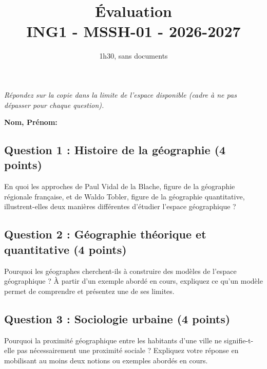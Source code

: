 \documentclass[
]{article}
\title{{\'E}valuation\\
ING1 - MSSH-01 - 2026-2027}
\author{}
\date{\vspace{-2.5em}1h30, sans documents}
\begin{document}
\maketitle

\textit{Répondez sur la copie dans la limite de l'espace disponible (cadre à ne pas dépasser pour chaque question).}

\medskip

\textbf{Nom, Prénom:}

\vspace{3cm}

\subsection{Question 1 : Histoire de la géographie (4 points)} %

En quoi les approches de Paul Vidal de la Blache, figure de la géographie régionale française, et de Waldo Tobler, figure de la géographie quantitative, illustrent-elles deux manières différentes d'étudier l'espace géographique ?

\framebox[\textwidth]{\rule{0pt}{10cm}}

\vspace{1cm}


\newpage


\subsection{Question 2 : Géographie théorique et quantitative (4 points)} %

Pourquoi les géographes cherchent-ils à construire des modèles de l'espace géographique ? À partir d'un exemple abordé en cours, expliquez ce qu'un modèle permet de comprendre et présentez une de ses limites.

\framebox[\textwidth]{\rule{0pt}{10cm}}

\medskip


\subsection{Question 3 : Sociologie urbaine (4 points)} %

Pourquoi la proximité géographique entre les habitants d'une ville ne signifie-t-elle pas nécessairement une proximité sociale ? Expliquez votre réponse en mobilisant au moins deux notions ou exemples abordés en cours.
\end{document}
